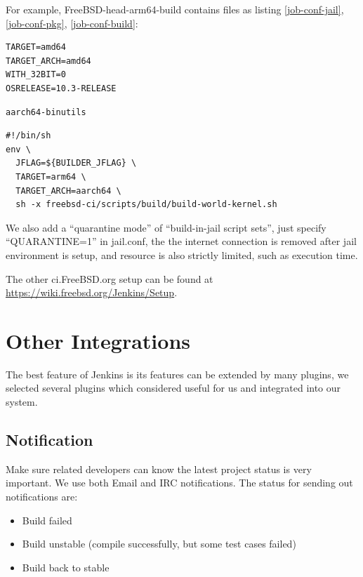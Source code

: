 \documentclass[a4paper,twocolumn,10pt]{article}
\begin{document}
For example, FreeBSD-head-arm64-build contains files as listing
\ref{job-conf-jail}, \ref{job-conf-pkg}, \ref{job-conf-build}:

\begin{lstlisting}[caption=Job configuration: jail.conf,label=job-conf-jail]
TARGET=amd64
TARGET_ARCH=amd64
WITH_32BIT=0
OSRELEASE=10.3-RELEASE
\end{lstlisting}

\begin{lstlisting}[caption=Job configuration: pkg-list,label=job-conf-pkg]
aarch64-binutils
\end{lstlisting}

\begin{lstlisting}[caption=Job configuration: build.sh,label=job-conf-build]
#!/bin/sh
env \
  JFLAG=${BUILDER_JFLAG} \
  TARGET=arm64 \
  TARGET_ARCH=aarch64 \
  sh -x freebsd-ci/scripts/build/build-world-kernel.sh
\end{lstlisting}

We also add a ``quarantine mode'' of ``build-in-jail script sets'', just
specify ``QUARANTINE=1'' in jail.conf, the the internet connection is removed
after jail environment is setup, and resource is also strictly limited, such as
execution time.

The other ci.FreeBSD.org setup can be found at
\url{https://wiki.freebsd.org/Jenkins/Setup}.

\section{Other Integrations}

The best feature of Jenkins is its features can be extended by many plugins, we
selected several plugins which considered useful for us and integrated into our
system.

\subsection{Notification}

Make sure related developers can know the latest project status is very
important. We use both Email and IRC notifications. The status for sending out
notifications are:

\begin{itemize}
\item Build failed
\item Build unstable (compile successfully, but some test cases failed)
\item Build back to stable
\end{itemize}
\end{document}
